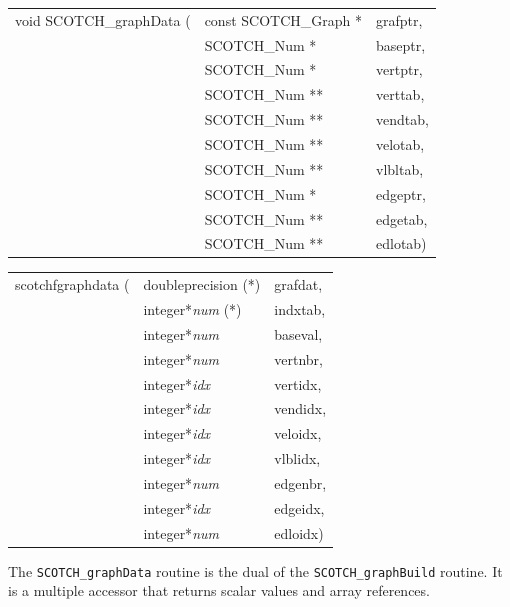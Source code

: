 \begin{itemize}
\progsyn

{\tt\begin{tabular}{l@{}ll}
void SCOTCH\_graphData ( & const SCOTCH\_Graph * & grafptr, \\
                         & SCOTCH\_Num *         & baseptr, \\
                         & SCOTCH\_Num *         & vertptr, \\
                         & SCOTCH\_Num **        & verttab, \\
                         & SCOTCH\_Num **        & vendtab, \\
                         & SCOTCH\_Num **        & velotab, \\
                         & SCOTCH\_Num **        & vlbltab, \\
                         & SCOTCH\_Num *         & edgeptr, \\
                         & SCOTCH\_Num **        & edgetab, \\
                         & SCOTCH\_Num **        & edlotab)
\end{tabular}}

{\tt\begin{tabular}{l@{}ll}
scotchfgraphdata ( & doubleprecision (*)   & grafdat, \\
                   & integer*{\it num} (*) & indxtab, \\
                   & integer*{\it num}     & baseval, \\
                   & integer*{\it num}     & vertnbr, \\
                   & integer*{\it idx}     & vertidx, \\
                   & integer*{\it idx}     & vendidx, \\
                   & integer*{\it idx}     & veloidx, \\
                   & integer*{\it idx}     & vlblidx, \\
                   & integer*{\it num}     & edgenbr, \\
                   & integer*{\it idx}     & edgeidx, \\
                   & integer*{\it num}     & edloidx)
\end{tabular}}

\progdes

The {\tt SCOTCH\_graphData} routine is the dual of the
{\tt SCOTCH\_\lbt graph\lbo Build} routine. It is a multiple
accessor that returns scalar values and array references.


\end{itemize}
